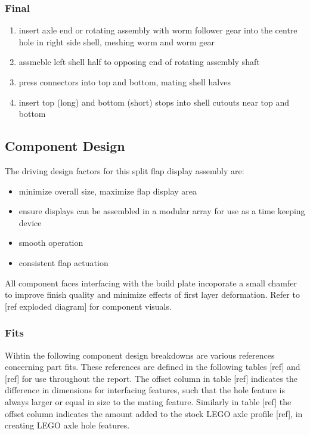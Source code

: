 \documentclass[11pt]{article}
\begin{document}
\subsubsection{Final}
\label{sec:org1f4616a}
\begin{enumerate}
\item insert axle end or rotating assembly with worm follower gear into the centre hole in right side shell, meshing worm and worm gear
\item assmeble left shell half to opposing end of rotating assembly shaft
\item press connectors into top and bottom, mating shell halves
\item insert top (long) and bottom (short) stops into shell cutouts near top and bottom
\end{enumerate}

\subsection{Component Design}
\label{sec:org40e3b31}
The driving design factors for this split flap display assembly are:
\begin{itemize}
\item minimize overall size, maximize flap display area
\item ensure displays can be assembled in a modular array for use as a time keeping device
\item smooth operation
\item consistent flap actuation
\end{itemize}

All component faces interfacing with the build plate incoporate a small chamfer to improve finish quality and minimize effects of first layer deformation. Refer to [ref exploded diagram] for component visuals.

\subsubsection{Fits}
\label{sec:org13a214d}
Wihtin the following component design breakdowns are various references concerning part fits. These references are defined in the following tables [ref] and [ref] for use throughout the report. The offset column in table [ref] indicates the difference in dimensions for interfacing features, such that the hole feature is always larger or equal in size to the mating feature. Similarly in table [ref] the offset column indicates the amount added to the stock LEGO axle profile [ref], in creating LEGO axle hole features. 
\end{document}
